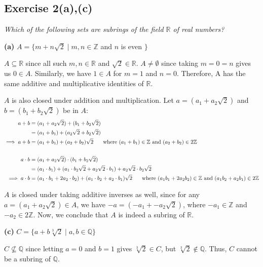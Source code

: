 \subsection*{Exercise 2(a),(c)}
\textit{Which of the following sets are subrings of the field $\mathbb{R}$ of real numbers?}

\textbf{(a)} $A = \{m + n\sqrt{2} \mid m,n \in \mathbb{Z}$ and $n$ is even $\}$

\vspace{5 mm}
$A \subseteq \mathbb{R}$ since all such $m,n \in \mathbb{R}$ and $\sqrt{2} \in\mathbb{R}$. $A \not= \emptyset$ since taking $m = 0 = n$ gives us $0 \in A$. Similarly, we have $1 \in A$ for $m = 1$ and $n = 0$. Therefore, A has the same additive and multiplicative identities of $\mathbb{R}$. 

$A$ is also closed under addition and multiplication. Let $a = (a_1 + a_2\sqrt{2})$ and $b = (b_1 + b_2\sqrt{2})$ be in $A$:
\begin{align*}
    a + b &= (a_1 + a_2\sqrt{2}) + (b_1 + b_2\sqrt{2}) \\
    &= (a_1 + b_1) + (a_2\sqrt{2} + b_2\sqrt{2}) \\
    \implies a + b &= (a_1 + b_1) + (a_2 + b_2)\sqrt{2} \hspace{5 mm} \textnormal{ where } (a_1 + b_1) \in \mathbb{Z} \textnormal{ and } (a_2 + b_2) \in 2\mathbb{Z} \\
    & \\
    a \cdot b &= (a_1 + a_2\sqrt{2})\cdot(b_1 + b_2\sqrt{2}) \\
    &= (a_1 \cdot b_1) + (a_1\cdot b_2\sqrt{2} + a_2\sqrt{2} \cdot b_1) + a_2\sqrt{2}\cdot b_2\sqrt{2} \\
   \implies a \cdot b &= (a_1\cdot b_1 + 2a_2\cdot b_2) + (a_1\cdot b_2 + a_2\cdot b_1)\sqrt{2} \hspace{5 mm} \textnormal{ where } (a_1b_1 + 2a_2b_2) \in \mathbb{Z} \textnormal{ and } (a_1b_2 + a_2b_1) \in 2\mathbb{Z} 
\end{align*}

$A$ is closed under taking additive inverses as well, since for any $a = (a_1 + a_2\sqrt{2}) \in A$, we have $-a = (-a_1 + -a_2\sqrt{2})$, where $-a_1 \in \mathbb{Z}$ and $-a_2 \in 2\mathbb{Z}$. Now, we conclude that $A$ is indeed a subring of $\mathbb{R}$.
\vspace{5 mm}

\textbf{(c)} $C = \{a + b\sqrt[3]{2} \mid a,b \in \mathbb{Q} \}$

\vspace{5 mm}
$C \not\subseteq \mathbb{Q}$ since letting $a = 0$ and $b = 1$ gives $\sqrt[3]{2} \in C$, but $\sqrt[3]{2} \not\in \mathbb{Q}$. Thus, $C$ cannot be a subring of $\mathbb{Q}$.